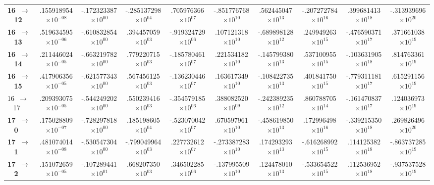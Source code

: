 \documentclass[reviewcopy]{elsarticle}
\begin{document}
\begin{landscape}
\begin{longtable}{lccccccccc}
{\bf 16~$\to$~ 12}  &   .155918954$\times10^{-08}$ & -.172323387$\times10^{ 00}$ & -.285137298$\times10^{ 04}$ &  .705976366$\times10^{ 07}$ & -.851776768$\times10^{ 10}$ &  .562445047$\times10^{ 13}$ & -.207272784$\times10^{ 16}$ &  .399681413$\times10^{ 18}$ & -.313939696$\times10^{ 20}$ \\
{\bf 16~$\to$~ 13}  &   .519634595$\times10^{-06}$ & -.610832854$\times10^{ 00}$ &  .394457059$\times10^{ 03}$ & -.919324729$\times10^{ 06}$ &  .107121318$\times10^{ 10}$ & -.689898128$\times10^{ 12}$ &  .249949263$\times10^{ 15}$ & -.476590371$\times10^{ 17}$ &  .371661038$\times10^{ 19}$ \\
{\bf 16~$\to$~ 14}  &   .211446024$\times10^{-05}$ & -.663219782$\times10^{ 00}$ &  .779220715$\times10^{ 03}$ & -.185780461$\times10^{ 07}$ &  .221534182$\times10^{ 10}$ & -.145799380$\times10^{ 13}$ &  .537100955$\times10^{ 15}$ & -.103631905$\times10^{ 18}$ &  .814763361$\times10^{ 19}$ \\
{\bf 16~$\to$~ 15}  &   .417906356$\times10^{-05}$ & -.621577343$\times10^{ 00}$ &  .567456125$\times10^{ 03}$ & -.136230446$\times10^{ 07}$ &  .163617349$\times10^{ 10}$ & -.108422735$\times10^{ 13}$ &  .401841750$\times10^{ 15}$ & -.779311181$\times10^{ 17}$ &  .615291156$\times10^{ 19}$ \\
 16~$\to$~ 17  &   .209393075$\times10^{-05}$ & -.544249202$\times10^{ 00}$ &  .550239416$\times10^{ 03}$ & -.354579185$\times10^{ 06}$ &  .388082520$\times10^{ 09}$ & -.242389235$\times10^{ 12}$ &  .860788705$\times10^{ 14}$ & -.161470837$\times10^{ 17}$ &  .124036973$\times10^{ 19}$ \\[7pt]
{\bf 17~$\to$~ 0}   &   .175028809$\times10^{-07}$ & -.728297818$\times10^{ 00}$ &  .185198605$\times10^{ 04}$ & -.523070042$\times10^{ 07}$ &  .670597961$\times10^{ 10}$ & -.458619850$\times10^{ 13}$ &  .172996498$\times10^{ 16}$ & -.339215350$\times10^{ 18}$ &  .269826496$\times10^{ 20}$ \\
{\bf 17~$\to$~ 1}   &   .481074014$\times10^{-08}$ & -.530547304$\times10^{ 00}$ & -.799049964$\times10^{ 03}$ &  .227732612$\times10^{ 07}$ & -.273387283$\times10^{ 10}$ &  .174293293$\times10^{ 13}$ & -.616268992$\times10^{ 15}$ &  .114125382$\times10^{ 18}$ & -.863737285$\times10^{ 19}$ \\
{\bf 17~$\to$~ 2}   &   .151072659$\times10^{-05}$ & -.107289441$\times10^{ 01}$ &  .668207350$\times10^{ 03}$ &  .346502285$\times10^{ 06}$ & -.137995509$\times10^{ 10}$ &  .124478010$\times10^{ 13}$ & -.533654522$\times10^{ 15}$ &  .112536952$\times10^{ 18}$ & -.937537528$\times10^{ 19}$ \\

\end{longtable}
\end{landscape}
\end{document}
